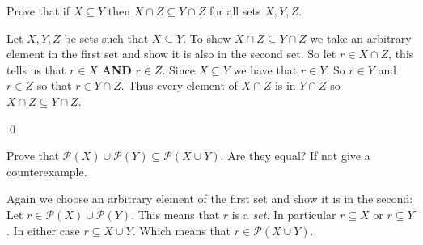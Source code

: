 \documentclass[addpoints]{exam}
\newcommand{\naturals}{\mathbb{N}}
\newcommand{\reals}{\mathbb{R}}
\newcommand{\integers}{\mathbb{Z}}
\begin{document}
\begin{questions}

  \question[5] Prove that if $X\subseteq Y$ then $X\cap Z \subseteq Y\cap Z$ for
  all sets $X,Y,Z$. 
  \begin{solution}
    Let $X,Y,Z$ be sets such that $X\subseteq Y$. To show $X\cap Z \subseteq
    Y\cap Z$ we take an arbitrary element in the first set and show it is also
    in the second set. So let $r \in X\cap Z$, this tells us that $r\in X$
    \textbf{AND} $r\in Z$. Since $X\subseteq Y$ we have that $r\in Y$. So $r\in
    Y$ and $r\in Z$ so that $r\in Y\cap Z$. Thus every element of $X\cap Z$ is
    in $Y\cap Z$ so $X\cap Z \subseteq Y\cap Z$.

    \qed
  \end{solution}

  \question[5] Prove that $\mathcal{P}(X) \cup \mathcal{P}(Y) \subseteq 
  \mathcal{P}(X\cup Y)$. Are they equal? If not give a counterexample.
  \begin{solution}
    Again we choose an arbitrary element of the first set and show it is in the
    second: Let $r\in \mathcal{P}(X)\cup \mathcal{P}(Y)$. This means that $r$ is
    a \emph{set}. In particular $r\subseteq X$ or $r\subseteq Y$. In either case
    $r\subseteq X\cup Y$. Which means that $r\in\mathcal{P}(X\cup Y)$.


\end{solution}
\end{questions}
\end{document}
